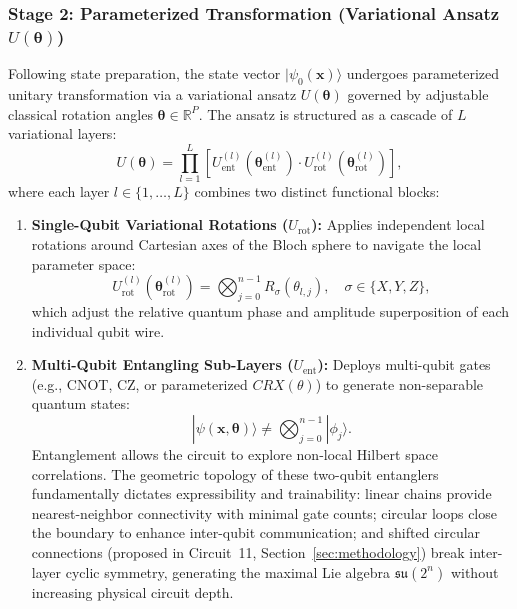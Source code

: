 \documentclass[journal]{IEEEtran}
\begin{document}
\subsubsection{Stage 2: Parameterized Transformation (Variational Ansatz $U(\boldsymbol{\theta})$)}
Following state preparation, the state vector $|\psi_0(\mathbf{x})\rangle$ undergoes parameterized unitary transformation via a variational ansatz $U(\boldsymbol{\theta})$ governed by adjustable classical rotation angles $\boldsymbol{\theta} \in \mathbb{R}^P$. The ansatz is structured as a cascade of $L$ variational layers:
\begin{equation}
U(\boldsymbol{\theta}) = \prod_{l=1}^L \left[ U_{\mathrm{ent}}^{(l)}(\boldsymbol{\theta}_{\mathrm{ent}}^{(l)}) \cdot U_{\mathrm{rot}}^{(l)}(\boldsymbol{\theta}_{\mathrm{rot}}^{(l)}) \right],
\label{eq:ansatz_general_flow}
\end{equation}
where each layer $l \in \{1, \dots, L\}$ combines two distinct functional blocks:
\begin{enumerate}
    \item \textbf{Single-Qubit Variational Rotations ($U_{\mathrm{rot}}$):} Applies independent local rotations around Cartesian axes of the Bloch sphere to navigate the local parameter space:
    \begin{equation}
    U_{\mathrm{rot}}^{(l)}(\boldsymbol{\theta}_{\mathrm{rot}}^{(l)}) = \bigotimes_{j=0}^{n-1} R_{\sigma}\left(\theta_{l,j}\right), \quad \sigma \in \{X, Y, Z\},
    \label{eq:rot_block_general}
    \end{equation}
    which adjust the relative quantum phase and amplitude superposition of each individual qubit wire.
    \item \textbf{Multi-Qubit Entangling Sub-Layers ($U_{\mathrm{ent}}$):} Deploys multi-qubit gates (e.g., CNOT, CZ, or parameterized $CRX(\theta)$) to generate non-separable quantum states:
    \begin{equation}
    |\psi(\mathbf{x}, \boldsymbol{\theta})\rangle \neq \bigotimes_{j=0}^{n-1} |\phi_j\rangle.
    \label{eq:entanglement_nonseparable}
    \end{equation}
    Entanglement allows the circuit to explore non-local Hilbert space correlations. The geometric topology of these two-qubit entanglers fundamentally dictates expressibility and trainability: linear chains provide nearest-neighbor connectivity with minimal gate counts; circular loops close the boundary to enhance inter-qubit communication; and shifted circular connections (proposed in Circuit~11, Section~\ref{sec:methodology}) break inter-layer cyclic symmetry, generating the maximal Lie algebra $\mathfrak{su}(2^n)$ without increasing physical circuit depth.
\end{enumerate}
\end{document}
